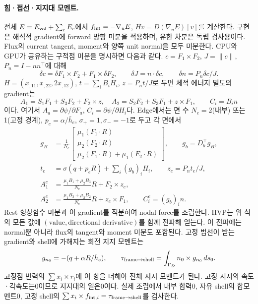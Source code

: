 \documentclass[10pt]{article}
\begin{document}
\paragraph{힘·접선·지지대 모멘트.}
전체 \(E=E_{\rm vol}+\sum_eE_e\)에서 \(f_{\rm int}=-\nabla_uE\),
\(Hv=D(\nabla_uE)[v]\)를 계산한다. 구현은 해석적 gradient에 forward 방향 미분을 적용하며,
유한 차분은 독립 검사용이다. Flux의 current tangent, moment와 양쪽 unit normal을 모두 미분한다.
CPU와 GPU가 공유하는 구적점 미분을 명시하면 다음과 같다.
\(c=F_1\times F_2\), \(J=\|c\|\), \(P_n=I-nn^\top\)에 대해
\[
 \delta c=\delta F_1\times F_2+F_1\times\delta F_2,\qquad
 \delta J=n\cdot\delta c,\qquad \delta n=P_n\delta c/J.
\]
\(H=(x_{,11},x_{,22},2x_{,12})\), \(t=\sum_i B_iH_i\), \(z=P_nt/J\)로 두면
체적 에너지 밀도의 gradient는
\[
 A_1=S_1F_1+S_3F_2+F_2\times z,\quad
 A_2=S_2F_2+S_3F_1+z\times F_1,\qquad C_i=B_i n
\]
이다. 여기서 \(A_a=\partial\psi/\partial F_a\), \(C_i=\partial\psi/\partial H_i\)다.
Edge에서는 면 수 \(N_e=2\)(내부) 또는1(고정 경계), \(p_e=\alpha/\bar h_e\),
\(\sigma_+=1,\sigma_-=-1\)로 두고 각 면에서
\[
 \begin{aligned}
 g_B&=\frac1{N_e}
 \begin{bmatrix}\mu_1(F_1\cdot R)\\\mu_2(F_2\cdot R)\\
 \mu_2(F_1\cdot R)+\mu_1(F_2\cdot R)\end{bmatrix},\qquad
 g_b=D_b^\top g_B,\\
 t_e&=\sigma(q+p_eR)+\sum_i(g_b)_iH_i,\qquad z_e=P_nt_e/J,\\
 A_1^e&=\frac{\mu_1B_1+\mu_2B_3}{N_e}R+F_2\times z_e,\\
 A_2^e&=\frac{\mu_1B_3+\mu_2B_2}{N_e}R+z_e\times F_1,\qquad
 C_i^e=(g_b)_i n .
 \end{aligned}
\]
Rest 형상함수 미분과 이 gradient를 적분하여 nodal force를 조립한다.
HVP는 위 식의 모든 값에 \((\text{value},\text{directional derivative})\)를 함께 전파해 얻는다.
이 전파에는 normal뿐 아니라 flux의 tangent와 moment 미분도 포함된다.
고정 법선이 받는 gradient와 shell에 가해지는 회전 지지 모멘트는
\begin{equation}
 g_{n_0}=-(q+\alpha R/\bar h_e),\qquad
 \tau_{\rm frame\to shell}=\int_{\Gamma_D}n_0\times g_{n_0}\,ds_0.
 \label{eq:r1-p3-shell-support-torque}
\end{equation}
고정점 반력의 \(\sum x_i\times r_i\)에 이 항을 더해야 전체 지지 모멘트가 된다.
고정 지지의 속도·각속도는0이므로 지지대의 일은0이다.
실제 조립에서 내부 합력0, 자유 shell의 합모멘트0, 고정 shell의
\(\sum x_i\times f_{{\rm int},i}=\tau_{\rm frame\to shell}\)를 검사한다.
\end{document}
